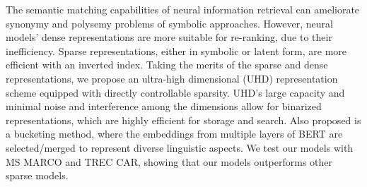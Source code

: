 The semantic matching capabilities of neural information retrieval can ameliorate synonymy and polysemy problems of symbolic approaches. However, neural models' dense representations are more suitable for re-ranking, due to their inefficiency. Sparse representations, either in symbolic or latent form, are more efficient with an inverted index. Taking the merits of the sparse and dense representations, we propose an ultra-high dimensional (UHD) representation scheme equipped with directly controllable sparsity. UHD's large capacity and minimal noise and interference among the dimensions allow for binarized representations, which are highly efficient for storage and search. Also proposed is a bucketing method, where the embeddings from multiple layers of BERT are selected/merged to represent diverse linguistic aspects. We test our models with MS MARCO and TREC CAR, showing that our models outperforms other sparse models.
